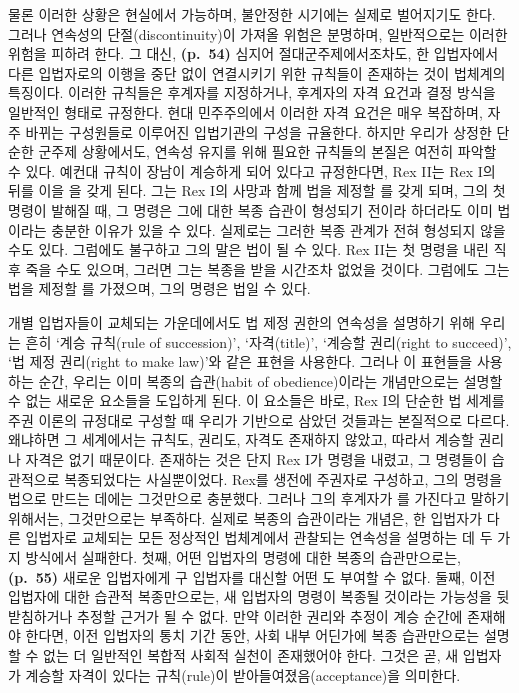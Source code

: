 물론 이러한 상황은 현실에서 가능하며, 불안정한 시기에는 실제로
벌어지기도 한다. 그러나 연속성의 단절(discontinuity)이 가져올 위험은
분명하며, 일반적으로는 이러한 위험을 피하려 한다. 그 대신,
\textbf{(p.~54)} 심지어 절대군주제에서조차도, 한 입법자에서 다른
입법자로의 이행을 중단 없이 연결시키기 위한 규칙들이 존재하는 것이
법체계의 특징이다. 이러한 규칙들은  후계자를
지정하거나, 후계자의 자격 요건과 결정 방식을 일반적인 형태로 규정한다.
현대 민주주의에서 이러한 자격 요건은 매우 복잡하며, 자주 바뀌는
구성원들로 이루어진 입법기관의 구성을 규율한다. 하지만 우리가 상정한
단순한 군주제 상황에서도, 연속성 유지를 위해 필요한 규칙들의 본질은
여전히 파악할 수 있다. 예컨대 규칙이 장남이 계승하게 되어 있다고
규정한다면, Rex II는 Rex I의 뒤를 이을 을 갖게 된다.
그는 Rex I의 사망과 함께 법을 제정할 를 갖게 되며,
그의 첫 명령이 발해질 때, 그 명령은 그에 대한 복종 습관이 형성되기
전이라 하더라도 이미 법이라는 충분한 이유가 있을 수 있다. 실제로는
그러한 복종 관계가 전혀 형성되지 않을 수도 있다. 그럼에도 불구하고 그의
말은 법이 될 수 있다. Rex II는 첫 명령을 내린 직후 죽을 수도 있으며,
그러면 그는 복종을 받을 시간조차 없었을 것이다. 그럼에도 그는 법을
제정할 를 가졌으며, 그의 명령은 법일 수 있다.

개별 입법자들이 교체되는 가운데에서도 법 제정 권한의 연속성을 설명하기
위해 우리는 흔히 `계승 규칙(rule of succession)', `자격(title)', `계승할
권리(right to succeed)', `법 제정 권리(right to make law)'와 같은 표현을
사용한다. 그러나 이 표현들을 사용하는 순간, 우리는 이미 복종의
습관(habit of obedience)이라는 개념만으로는 설명할 수 없는 새로운
요소들을 도입하게 된다. 이 요소들은 바로, Rex I의 단순한 법 세계를 주권
이론의 규정대로 구성할 때 우리가 기반으로 삼았던 것들과는 본질적으로
다르다. 왜냐하면 그 세계에서는 규칙도, 권리도, 자격도 존재하지 않았고,
따라서 계승할 권리나 자격은  없기 때문이다.
존재하는 것은 단지 Rex I가 명령을 내렸고, 그 명령들이 습관적으로
복종되었다는 사실뿐이었다. Rex를 생전에 주권자로 구성하고, 그의 명령을
법으로 만드는 데에는 그것만으로 충분했다. 그러나 그의 후계자가
를 가진다고 말하기 위해서는, 그것만으로는 부족하다.
실제로 복종의 습관이라는 개념은, 한 입법자가 다른 입법자로 교체되는 모든
정상적인 법체계에서 관찰되는 연속성을 설명하는 데 두 가지 방식에서
실패한다. 첫째, 어떤 입법자의 명령에 대한 복종의 습관만으로는,
\textbf{(p.~55)} 새로운 입법자에게 구 입법자를 대신할 어떤
도 부여할 수 없다. 둘째, 이전 입법자에 대한 습관적
복종만으로는, 새 입법자의 명령이 복종될 것이라는 가능성을 뒷받침하거나
추정할 근거가 될 수 없다. 만약 이러한 권리와 추정이 계승 순간에 존재해야
한다면, 이전 입법자의 통치 기간 동안, 사회 내부 어딘가에 복종
습관만으로는 설명할 수 없는 더 일반적인 복합적 사회적 실천이 존재했어야
한다. 그것은 곧, 새 입법자가 계승할 자격이 있다는 규칙(rule)이
받아들여졌음(acceptance)을 의미한다.

